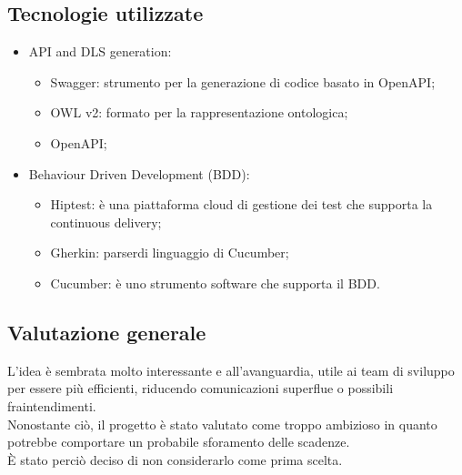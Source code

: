 \subsection{Tecnologie utilizzate}
\begin{itemize}
\item API and DLS generation: \begin{itemize}
\item Swagger: strumento per la generazione di codice basato in OpenAPI;
\item OWL v2: formato per la rappresentazione ontologica;
\item OpenAPI;	
\end{itemize}
\item Behaviour Driven Development (BDD\glo): \begin{itemize}
\item Hiptest: è una piattaforma cloud di gestione dei test che supporta la continuous delivery\glo;
\item Gherkin: parser\glo di linguaggio di Cucumber;
\item Cucumber: è uno strumento software che supporta il BDD.
\end{itemize}
\end{itemize}

\subsection{Valutazione generale}
L’idea è sembrata molto interessante e all’avanguardia, utile ai team di sviluppo per essere più efficienti, riducendo comunicazioni superflue o possibili fraintendimenti.  \\
Nonostante ciò, il progetto è stato valutato come troppo ambizioso in quanto potrebbe comportare un probabile sforamento delle scadenze.  \\
È stato perciò deciso di non considerarlo come prima scelta.



